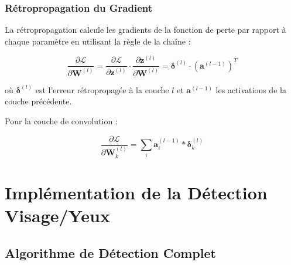 \subsubsection{Rétropropagation du Gradient}

La rétropropagation calcule les gradients de la fonction de perte par rapport à chaque paramètre en utilisant la règle de la chaîne :

\begin{equation}
\frac{\partial \mathcal{L}}{\partial \mathbf{W}^{(l)}} = \frac{\partial \mathcal{L}}{\partial \mathbf{z}^{(l)}} \cdot \frac{\partial \mathbf{z}^{(l)}}{\partial \mathbf{W}^{(l)}} = \boldsymbol{\delta}^{(l)} \cdot (\mathbf{a}^{(l-1)})^T
\label{eq:backprop}
\end{equation}

où $\boldsymbol{\delta}^{(l)}$ est l'erreur rétropropagée à la couche $l$ et $\mathbf{a}^{(l-1)}$ les activations de la couche précédente.

Pour la couche de convolution :

\begin{equation}
\frac{\partial \mathcal{L}}{\partial \mathbf{W}_k^{(l)}} = \sum_{i} \mathbf{a}_i^{(l-1)} * \boldsymbol{\delta}_k^{(l)}
\label{eq:conv_backprop}
\end{equation}

\section{Implémentation de la Détection Visage/Yeux}

\subsection{Algorithme de Détection Complet}

